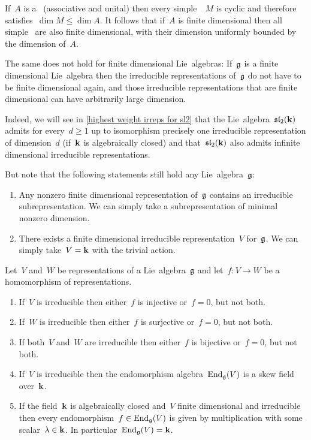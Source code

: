 \begin{remark}
  If~$A$ is a~{\algebra{$\kf$}} (associative and unital) then every simple~{}~$M$ is cyclic and therefore satisfies~$\dim M \leq \dim A$.
  It follows that if~$A$ is finite dimensional then all simple~{} are also finite dimensional, with their dimension uniformly bounded by the dimension of~$A$.
  
  The same does not hold for finite dimensional Lie~algebras:
  If~$\mathfrak{g}$ is a finite dimensional Lie~algebra then the irreducible representations of~$\mathfrak{g}$ do not have to be finite dimensional again, and those irreducible representations that are finite dimensional can have arbitrarily large dimension.
  
  Indeed, we will see in \cref{highest weight irreps for sl2} that the Lie~algebra~$\mathfrak{sl}_2(\mathbf{k})$ admits for every~$d \geq 1$ up to isomorphism precisely one irreducible representation of dimension~$d$ (if~$\kf$ is algebraically closed) and that~$\mathfrak{sl}_2(\mathbf{k})$ also admits infinite dimensional irreducible representations.
  
  But note that the following statements still hold any Lie~algebra~$\mathfrak{g}$:
  \begin{enumerate}
    \item
      Any nonzero finite dimensional representation of~$\mathfrak{g}$ contains an irreducible subrepresentation.
      We can simply take a subrepresentation of minimal nonzero dimension.
    \item
      There exists a finite dimensional irreducible representation~$V$ for~$\mathfrak{g}$.
      We can simply take~$V = \mathbf{k}$ with the trivial action.
  \end{enumerate}
\end{remark}


\begin{lemma}[Schur]
  Let~$V$ and~$W$ be representations of a Lie~algebra~$\mathfrak{g}$ and let~$f \colon V \to W$ be a homomorphism of representations.
  \begin{enumerate}
    \item
      If~$V$ is irreducible then either~$f$ is injective or~$f = 0$, but not both.
    \item
      If~$W$ is irreducible then either~$f$ is surjective or~$f = 0$, but not both.
    \item
      If both~$V$ and~$W$ are irreducible then either~$f$ is bijective or~$f = 0$, but not both.
    \item
      If~$V$ is irreducible then the endomorphism algebra~$\operatorname{End}_{\mathfrak{g}}(V)$ is a skew field over~$\kf$.
    \item
      If the field~$\kf$ is algebraically closed and~$V$ finite dimensional and irreducible then every endomorphism~$f \in \operatorname{End}_{\mathfrak{g}}(V)$ is given by multiplication with some scalar~$\lambda \in \mathbf{k}$.
      In particular~$\operatorname{End}_{\mathfrak{g}}(V) = \mathbf{k}$.
  \end{enumerate}
\end{lemma}


